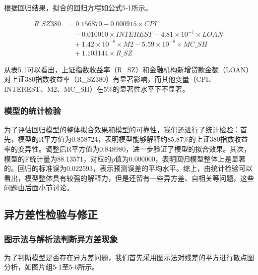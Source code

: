 \documentclass[12pt, a4paper]{article}
\numberwithin{equation}{section}
\begin{document}
根据回归结果，拟合的回归方程如公式5-1所示。

\[
    \begin{aligned}
        R\_{\textit{SZ}380} & = 0.156870 - 0.000915 \times \textit{CPI} \,                                                   \\
                            & \quad - 0.010010 \times \textit{INTEREST} - 4.81 \times 10^{-7} \times \textit{LOAN} \,        \\
                            & \quad + 1.42 \times 10^{-8} \times \textit{M2} - 5.59 \times 10^{-8} \times \textit{MC\_SH} \, \\
                            & \quad + 1.103144 \times \textit{R\_SZ}
    \end{aligned}
    \tag{5-1}
\]

从表5.1可以看出，上证指数收益率（R\_SZ）和金融机构新增贷款金额（LOAN）对上证380指数收益率（R\_SZ380）有显著影响，而其他变量（CPI、INTEREST、M2、MC\_SH）在5\%的显著性水平下不显著。

\subsubsection{模型的统计检验}
为了评估回归模型的整体拟合效果和模型的可靠性，我们还进行了统计检验：首先，模型的R平方值为0.858724，表明模型能够解释约85.87\%的上证380指数收益率的变异性。调整后R平方值为0.848980，进一步验证了模型的拟合效果。其次，模型的F统计量为88.13571，对应的p值为0.000000，表明回归模型整体上是显著的。回归的标准误为0.022593，表示预测误差的平均水平。综上，由统计检验可以看出，模型整体具有较强的解释力，但是还留有一些异方差、自相关等问题，这些问题由后面小节讨论。


\subsection{异方差性检验与修正}
\subsubsection{图示法与解析法判断异方差现象}
为了判断模型是否存在异方差问题，我们首先采用图示法对残差的平方进行散点图分析，如图片组5-1至5-6所示。
\end{document}
